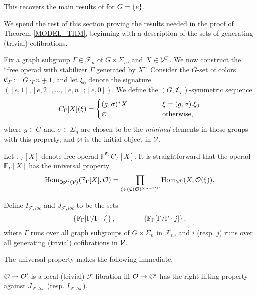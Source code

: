 \documentclass[a4paper,10pt
]{article}%
\renewcommand{\F}{\mathcal F}
\renewcommand{\1}{\ensuremath{\mathbb{id}}}
\begin{document}
\begin{remark}
      This recovers the main results of \cite{BM13, Cav14} for $G = \left\{e\right\}$. 
\end{remark}



We spend the rest of this section proving the results needed in the proof of Theorem \ref{MODEL_THM},
beginning with a description of the sets of generating (trivial) cofibrations.

Fix a graph subgroup $\Gamma \in \F_n$ of $G \times \Sigma_n$, and $X \in \mathcal V^\Gamma$.
We now construct the ``free operad with stabilizer $\Gamma$ generated by $X$''.
Consider the $G$-set of colors $\mathfrak C_\Gamma := G \cdot_\Gamma \underline{n+1}$,
and let $\xi_0$ denote the signature $([e,1],[e,2],\dots,[e,n];[e,0])$.
We define the $(G,\mathfrak C_\Gamma)$-symmetric sequence
\begin{equation}
      C_\Gamma[X](\xi) =
      \begin{cases}
            (g,\sigma)^{\**} X \qquad \qquad & \xi = (g,\sigma).\xi_0
            \\
            \varnothing & \mbox{otherwise,}
      \end{cases}
\end{equation}
where $g \in G$ and $\sigma \in \Sigma_n$ are chosen to be the \textit{minimal} elements in those groups with this property,
and $\varnothing$ is the initial object in $\mathcal V$.

Let $\mathbb F_\Gamma[X]$ denote free operad $\mathbb F^{\mathfrak C_\Gamma} C_\Gamma[X]$.
It is straightforward that the operad $\mathbb F_\Gamma[X]$ has the universal property
\begin{equation}
      \operatorname{Hom}_{\mathsf{Op}^G(\mathcal V)}(\mathbb F_\Gamma[X], \mathcal{O}) = \mathop\prod\limits_{\xi \in (\mathfrak C(\mathcal{O})^{\times n+1})^\Gamma}\operatorname{Hom}_{\mathcal V^\Gamma}(X, \mathcal{O}(\xi)).
\end{equation}

Define $I_{\F,loc}$ and $J_{\F, loc}$ to be the sets
\begin{align*}
  \left\{\mathbb F_\Gamma[\Gamma/\Gamma \cdot i]\right\}, \qquad \qquad \left\{\mathbb F_\Gamma[\Gamma/\Gamma \cdot j]\right\},
\end{align*}
where $\Gamma$ runs over all graph subgroups of $G \times \Sigma_n$ in $\F_n$,
and $i$ (resp. $j$) runs over all generating (trivial) cofibrations in $\mathcal V$.

The universal property makes the following immediate.
\begin{corollary}
      $\mathcal{O} \to \mathcal{O}'$ is a local (trivial) $\F$-fibration iff
      $\mathcal{O} \to \mathcal{O}'$ has the right lifting property against $J_{\F, loc}$ (resp. $I_{\F, loc}$).
\end{corollary}
\end{document}
